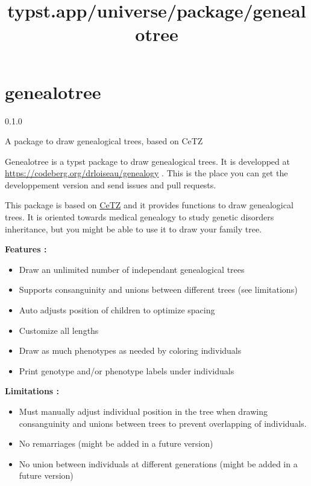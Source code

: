 \title{typst.app/universe/package/genealotree}

\label{banner}
\section{genealotree}\label{genealotree}

{ 0.1.0 }

A package to draw genealogical trees, based on CeTZ

\label{readme}
Genealotree is a typst package to draw genealogical trees. It is
developped at \url{https://codeberg.org/drloiseau/genealogy} . This is
the place you can get the developpement version and send issues and pull
requests.


This package is based on
\href{https://github.com/typst/packages/raw/main/packages/preview/genealotree/0.1.0/\%22https://typst.app/universe/package/cetz/\%22}{CeTZ}
and it provides functions to draw genealogical trees. It is oriented
towards medical genealogy to study genetic disorders inheritance, but
you might be able to use it to draw your family tree.

\textbf{Features :}

\begin{itemize}
\tightlist
\item
  Draw an unlimited number of independant genealogical trees
\item
  Supports consanguinity and unions between different trees (see
  limitations)
\item
  Auto adjusts position of children to optimize spacing
\item
  Customize all lengths
\item
  Draw as much phenotypes as needed by coloring individuals
\item
  Print genotype and/or phenotype labels under individuals
\end{itemize}

\textbf{Limitations :}

\begin{itemize}
\tightlist
\item
  Must manually adjust individual position in the tree when drawing
  consanguinity and unions between trees to prevent overlapping of
  individuals.
\item
  No remarriages (might be added in a future version)
\item
  No union between individuals at different generations (might be added
  in a future version)
\end{itemize}

